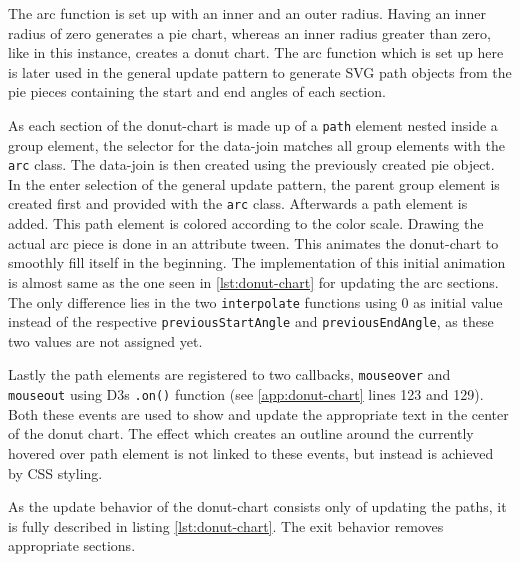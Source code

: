 The arc function is set up with an inner and an outer radius. Having an inner radius of zero generates a pie chart, whereas an inner radius greater than zero, like in this instance, creates a donut chart. The arc function which is set up here is later used in the general update pattern to generate SVG path objects from the pie pieces containing the start and end angles of each section.

As each section of the donut-chart is made up of a \texttt{path} element nested inside a group element, the selector for the data-join matches all group elements with the \texttt{arc} class. The data-join is then created using the previously created pie object. In the enter selection of the general update pattern, the parent group element is created first and provided with the \texttt{arc} class. Afterwards a path element is added. This path element is colored according to the color scale. Drawing the actual arc piece is done in an attribute tween. This animates the donut-chart to smoothly fill itself in the beginning. The implementation of this initial animation is almost same as the one seen in \ref{lst:donut-chart} for updating the arc sections. The only difference lies in the two \texttt{interpolate} functions using 0 as initial value instead of the respective \texttt{previousStartAngle} and \texttt{previousEndAngle}, as these two values are not assigned yet.

Lastly the path elements are registered to two callbacks, \texttt{mouseover} and \texttt{mouseout} using D3s \texttt{.on()} function (see \ref{app:donut-chart} lines 123 and 129). Both these events are used to show and update the appropriate text in the center of the donut chart. The effect which creates an outline around the currently hovered over path element is not linked to these events, but instead is achieved by CSS styling.

As the update behavior of the donut-chart consists only of updating the paths, it is fully described in listing \ref{lst:donut-chart}. The exit behavior removes appropriate sections.

